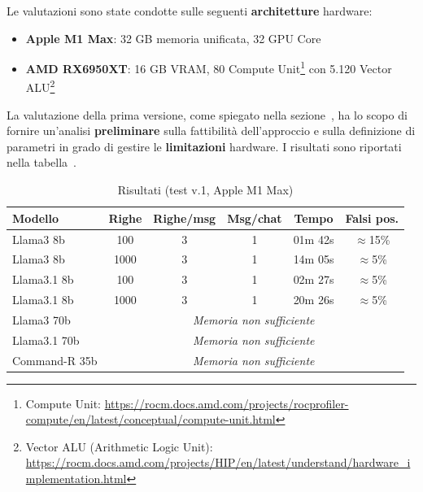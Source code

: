 \documentclass[12pt,twoside]{report}
\begin{document}
Le valutazioni sono state condotte sulle seguenti \textbf{architetture} hardware:
\begin{itemize}
    \item \textbf{Apple M1 Max}: 32 GB memoria unificata, 32 GPU Core
    \item \textbf{AMD RX6950XT}: 16 GB VRAM, 80 Compute Unit\footnote{Compute Unit: \url{https://rocm.docs.amd.com/projects/rocprofiler-compute/en/latest/conceptual/compute-unit.html}} con 5.120 Vector ALU\footnote{Vector ALU (Arithmetic Logic Unit): \url{https://rocm.docs.amd.com/projects/HIP/en/latest/understand/hardware_implementation.html}}
\end{itemize}


La valutazione della prima versione, come spiegato nella sezione~, ha lo scopo di fornire un'analisi \textbf{preliminare} sulla fattibilità dell'approccio e sulla definizione di parametri in grado di gestire le \textbf{limitazioni} hardware. I risultati sono riportati nella tabella~.

\begin{table}[h!]
    \centering
    \begin{tabular}{|l|c|c|c|c|c|}
        \hline
        \textbf{Modello} & \textbf{Righe}                                        & \textbf{Righe/msg} & \textbf{Msg/chat} & \textbf{Tempo} & \textbf{Falsi pos.} \\ \hline
        Llama3 8b        & 100                                                   & 3                  & 1                 & 01m 42s        & $\approx$15\%       \\ \hline
        Llama3 8b        & 1000                                                  & 3                  & 1                 & 14m 05s        & $\approx$5\%        \\ \hline
        Llama3.1 8b      & 100                                                   & 3                  & 1                 & 02m 27s        & $\approx$5\%        \\ \hline
        Llama3.1 8b      & 1000                                                  & 3                  & 1                 & 20m 26s        & $\approx$5\%        \\ \hline
        Llama3 70b       & \multicolumn{5}{c|}{\textit{Memoria non sufficiente}}                                                                                 \\ \hline
        Llama3.1 70b     & \multicolumn{5}{c|}{\textit{Memoria non sufficiente}}                                                                                 \\ \hline
        Command-R 35b    & \multicolumn{5}{c|}{\textit{Memoria non sufficiente}}                                                                                 \\ \hline
    \end{tabular}
    \caption{Risultati (test v.1, Apple M1 Max)}
    \label{tab:risultati_v1}
\end{table}
\end{document}
